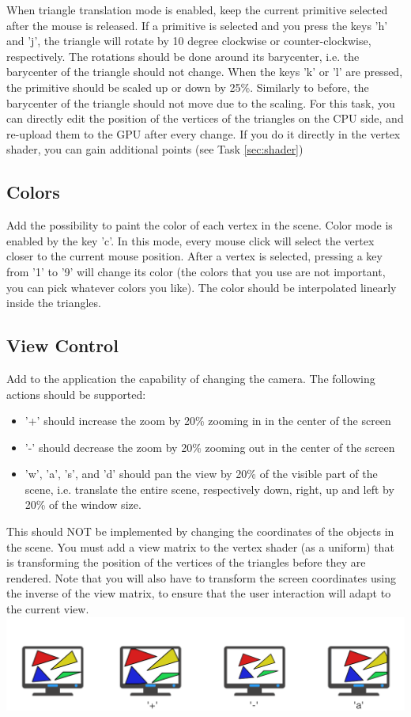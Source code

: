 \documentclass[11pt]{article}
\begin{document}
When triangle translation mode is enabled, keep the current primitive selected after the mouse is released. If a primitive is selected and you press the keys 'h' and 'j', the triangle will rotate by 10 degree clockwise or counter-clockwise, respectively. The rotations should be done around its barycenter, i.e. the barycenter of the triangle should not change. When the keys 'k' or 'l' are pressed, the primitive should be scaled up or down by 25\%. Similarly to before, the barycenter of the triangle should not move due to the scaling. For this task, you can directly edit the position of the vertices of the triangles on the CPU side, and re-upload them to the GPU after every change. If you do it directly in the vertex shader, you can gain additional points (see Task \ref{sec:shader})

\subsection{Colors}

Add the possibility to paint the color of each vertex in the scene. Color mode is enabled by the key 'c'. In this mode, every mouse click will select the vertex closer to the current mouse position. After a vertex is selected, pressing a key from '1' to '9' will change its color (the colors that you use are not important, you can pick whatever colors you like). The color should be interpolated linearly inside the triangles.

\subsection{View Control}

Add to the application the capability of changing the camera. The following actions should be supported:
\begin{itemize}
	\item '+' should increase the zoom by 20\% zooming in in the center of the screen
	\item '-' should decrease the zoom by 20\% zooming out in the center of the screen
	\item 'w', 'a', 's', and 'd' should pan the view by 20\% of the visible part of the scene, i.e. translate the entire scene, respectively down, right, up and left by 20\% of the window size.
\end{itemize}

This should NOT be implemented by changing the coordinates of the objects in the scene. You must add a view matrix to the vertex shader (as a uniform) that is transforming the position of the vertices of the triangles before they are rendered. Note that you will also have to transform the screen coordinates using the inverse of the view matrix, to ensure that the user interaction will adapt to the current view.
\includegraphics[width=1\textwidth]{view.pdf}
\end{document}
